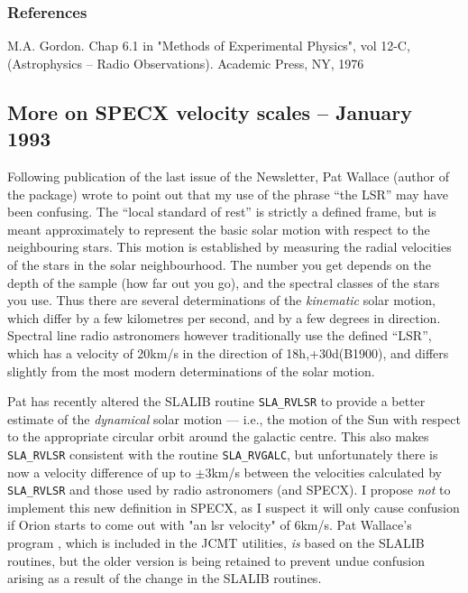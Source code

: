 \documentclass[twoside,11pt,nolof]{starlink}
\begin{document}
\subsubsection{References}

M.A. Gordon. Chap 6.1 in "Methods of Experimental Physics", vol 12-C,
    (Astrophysics -- Radio Observations). Academic Press, NY, 1976


\subsection{More on SPECX velocity scales -- January 1993}

Following publication of the last issue of the Newsletter, Pat Wallace (author
of the  package) wrote to point out that my use of the
phrase ``the LSR'' may have been confusing. The ``local standard of rest'' is
strictly a defined frame, but is meant approximately to represent the basic
solar motion with respect to the neighbouring stars. This motion is
established by measuring the radial velocities of the stars in the solar
neighbourhood. The number you get depends on the depth of the sample (how far
out you go), and the spectral classes of the stars you use. Thus there are
several determinations of the \emph{kinematic} solar motion, which differ by a
few kilometres per second, and by a few degrees in direction. Spectral line
radio astronomers however traditionally use the defined ``LSR'', which has a
velocity of 20km/s in the direction of 18h,+30d(B1900), and differs slightly
from the most modern determinations of the solar motion.

Pat has recently altered the SLALIB routine \texttt{SLA\_RVLSR} to provide a
better estimate of the \emph{dynamical} solar motion --- i.e., the motion of
the Sun with respect to the appropriate circular orbit around the galactic
centre.  This also makes \texttt{SLA\_RVLSR} consistent with the routine
\texttt{SLA\_RVGALC}, but unfortunately there is now a velocity difference of
up to $\pm 3$km/s between the velocities calculated by \texttt{SLA\_RVLSR} and
those used by radio astronomers (and SPECX). I propose \emph{not} to implement
this new definition in SPECX, as I suspect it will only cause confusion if
Orion starts to come out with "an lsr velocity" of 6km/s. Pat Wallace's
program , which is included in the JCMT utilities, \emph{is}
based on the SLALIB routines, but the older version is being retained to
prevent undue confusion arising as a result of the change in the SLALIB
routines.
\end{document}
